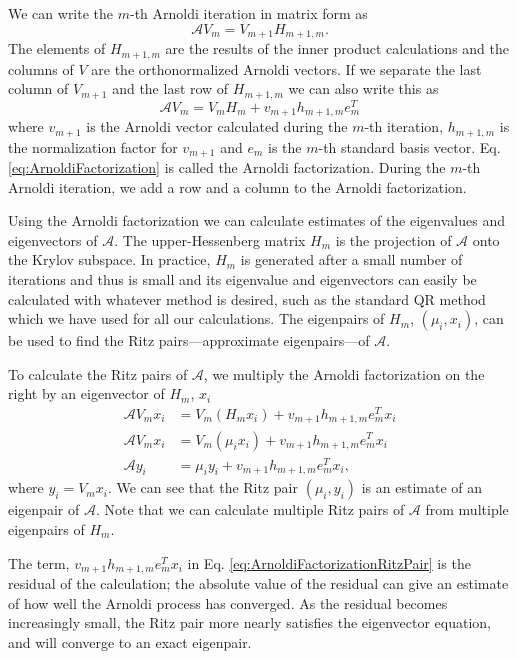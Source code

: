 \documentclass[12]{ansnse}
\newcommand{\A}{\ensuremath{\mathcal{A}}}
\begin{document}
\begin{doublespace}
We can write the $m$-th Arnoldi iteration in matrix form as
\begin{equation}
    \A V_m = V_{m+1} H_{m+1,m}.
\end{equation}
The elements of $H_{m+1,m}$ are the results of the inner product calculations and the columns of $V$ are the orthonormalized Arnoldi vectors.  If we separate the last column of $V_{m+1}$ and the last row of $H_{m+1,m}$ we can also write this as\cite{Watkins:2002Funda-0}
\begin{equation}
    \A V_m = V_mH_m + v_{m+1}h_{m+1,m}e_m^T
    \label{eq:ArnoldiFactorization}
\end{equation}
where $v_{m+1}$ is the Arnoldi vector calculated during the $m$-th iteration, $h_{m+1,m}$ is the normalization factor for $v_{m+1}$ and $e_m$ is the $m$-th standard basis vector.  Eq. \eqref{eq:ArnoldiFactorization} is called the Arnoldi factorization.  During the $m$-th Arnoldi iteration, we add a row and a column to the Arnoldi factorization.  

Using the Arnoldi factorization we can calculate estimates of the eigenvalues and eigenvectors of \A.  The upper-Hessenberg matrix $H_m$ is the projection of \A{} onto the Krylov subspace.  In practice, $H_m$ is generated after a small number of iterations and thus is small and its eigenvalue and eigenvectors can easily be calculated with whatever method is desired, such as the standard QR method which we have used for all our calculations.  The eigenpairs of $H_m$, $\left(\mu_i,x_i\right)$, can be used to find the Ritz pairs---approximate eigenpairs---of \A.  

To calculate the Ritz pairs of \A, we multiply the Arnoldi factorization on the right by an eigenvector of $H_m$, $x_i$
\begin{align}
    \A V_mx_i &= V_m\left( H_mx_i \right) + v_{m+1}h_{m+1,m}e_m^Tx_i \\
    \A V_mx_i &= V_m\left( \mu_ix_i \right) + v_{m+1}h_{m+1,m}e_m^Tx_i \\
    \A y_i &= \mu_iy_i + v_{m+1}h_{m+1,m}e_m^Tx_i,
    \label{eq:ArnoldiFactorizationRitzPair}
\end{align}
where $y_i = V_mx_i$.  We can see that the Ritz pair $\left(\mu_i, y_i\right)$ is an estimate of an eigenpair of \A.  Note that we can calculate multiple Ritz pairs of \A{} from multiple eigenpairs of $H_m$.

The term, $v_{m+1}h_{m+1,m}e_m^Tx_i$ in Eq. \eqref{eq:ArnoldiFactorizationRitzPair} is the residual of the calculation; the absolute value of the residual can give an estimate of how well the Arnoldi process has converged.  As the residual becomes increasingly small, the Ritz pair more nearly satisfies the eigenvector equation, and will converge to an exact eigenpair.


\end{doublespace}
\end{document}
